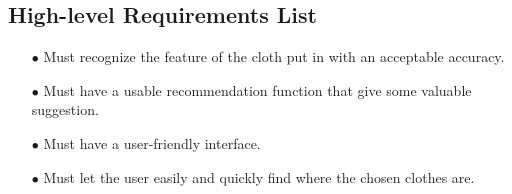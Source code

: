 \subsection{High-level Requirements List}
\begin{itemize}
   \item[$\bullet$] Must recognize the feature of the cloth put in with an acceptable accuracy.
   \item[$\bullet$] Must have a usable recommendation function that give some valuable suggestion.
   \item[$\bullet$] Must have a user-friendly interface.
   \item[$\bullet$] Must let the user easily and quickly find where the chosen clothes are.
   \end{itemize}


